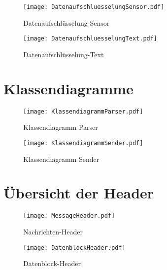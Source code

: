 \begin{figure}[H]
	\centering
	\texttt{[image: DatenaufschluesselungSensor.pdf]}
	\caption{Datenaufschlüsselung-Sensor}
\end{figure}

\begin{figure}[H]
	\centering
	\texttt{[image: DatenaufschluesselungText.pdf]}
	\caption{Datenaufschlüsselung-Text}
\end{figure}

\section{Klassendiagramme}
\label{sec:klassendiagramme}

\begin{figure}[H]
\centering
\texttt{[image: KlassendiagrammParser.pdf]}
\caption{Klassendiagramm Parser}
\label{fig:KlassendiagrammParser}
\end{figure}

\newpage

\begin{figure}[H]
\centering
\texttt{[image: KlassendiagrammSender.pdf]}
\caption{Klassendiagramm Sender}
\label{fig:KlassendiagrammSender}
\end{figure}

\section{Übersicht der Header}
\label{sec:HeaderUebersicht}

\begin{figure}[H]
	\centering
	\texttt{[image: MessageHeader.pdf]}
	\caption{Nachrichten-Header}
	\label{fig:NachrichtenHeader}
\end{figure}

\newpage

\begin{figure}[H]
	\centering
	\texttt{[image: DatenblockHeader.pdf]}
	\caption{Datenblock-Header}
	\label{fig:DatenblockHeader}
\end{figure}
